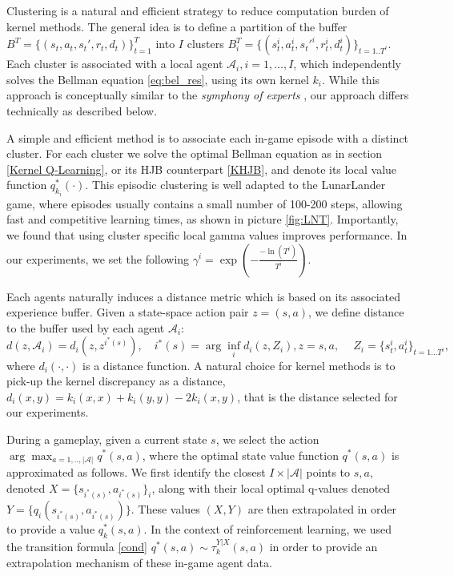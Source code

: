 \documentclass[
]{article}
\numberwithin{equation}{section}
\begin{document}
Clustering is a natural and efficient strategy to reduce computation burden of kernel methods. The general idea is to define a partition of the buffer $B^{T} = \{(s_t, a_t, s_{t}', r_t, d_t) \}_{t=1}^{T}$ into $I$ clusters $B_i^{T} = \{(s_t^i, a_t^i, s_{t}'^i, r_t^i, d_t^i) \}_{t=1..T^i}$. Each cluster is associated with a local agent $\mathcal{A}_i, i = 1, \dots, I$, which independently solves the Bellman equation \eqref{eq:bel_res}, using its own kernel $k_i$. While this approach is conceptually similar to the \textit{symphony of experts} \cite{Jon2023}, our approach differs technically as described below.

A simple and efficient method is to associate each in-game episode with a distinct cluster. For each cluster we solve the optimal Bellman equation as in section \ref{Kernel Q-Learning}, or its HJB counterpart \ref{KHJB}, and denote its local value function $q_{k_i}^*(\cdot)$. This episodic clustering is well adapted to the LunarLander game, where episodes usually contains a small number of 100-200 steps, allowing fast and competitive learning times, as shown in picture \ref{fig:LNT}. Importantly, we found that using cluster specific local gamma values improves performance. In our experiments, we set the following $\gamma^i=\exp(-\frac{-\ln(T^i)}{T^i})$. 

Each agents naturally induces a distance metric which is based on its associated experience buffer. Given a state-space action pair $z = (s,a)$, we define distance  to the buffer used by each agent $\mathcal{A}_i$:
$$
d(z,\mathcal{A}_i) = d_i(z,z^{i^*(s)}), \quad i^*(s) = \arg \inf_i d_i(z,Z_i), z=s,a, \ \quad Z_i = \{s_t^i, a_t^i\}_{t= 1 \ldots T^i},
$$
where $d_i(\cdot,\cdot)$ is a distance function. A natural choice for kernel methods is to pick-up the kernel discrepancy as a distance, $d_i(x,y) = k_i(x,x)+k_i(y,y) - 2 k_i(x,y)$, that is the distance selected for our experiments.

During a gameplay, given a current state $s$, we select the action $\arg \max_{a=1,..,|\mathcal{A}|} q^*(s,a)$, where the optimal state value function $q^*(s,a)$ is approximated as follows. We first identify the closest $I \times |\mathcal{A}|$ points to $s,a$, denoted $X = \{s_{i^*(s)},a_{i^*(s)}\}_i$, 
along with their local optimal q-values denoted $Y = \{q_i(s_{i^*(s)},a_{i^*(s)})\}$. These values $(X,Y)$ are then extrapolated in order to provide a value $q_k^*(s,a)$. In the context of reinforcement learning, we used the transition formula \eqref{cond} $q^*(s,a) \sim \tau_k^{Y | X}(s,a)$ in order to provide an extrapolation mechanism of these in-game agent data.
\end{document}
